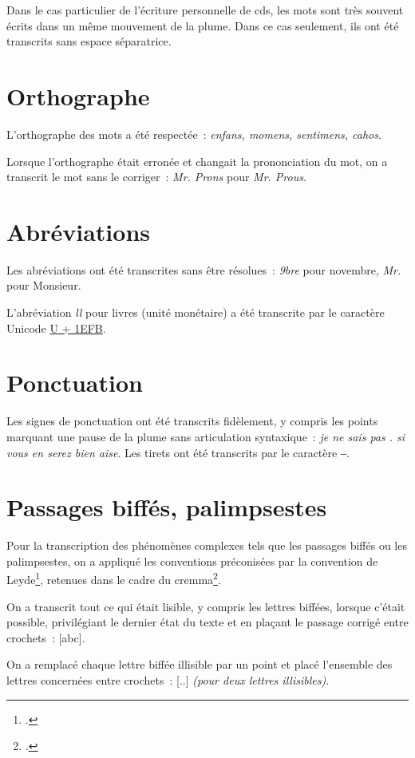 \documentclass[a4paper,12pt,twoside]{book}
\begin{document}
			Dans le cas particulier de l'écriture personnelle de \gls{cds}, les mots sont très souvent écrits dans un même mouvement de la plume. Dans ce cas seulement, ils ont été transcrits sans espace séparatrice.
				
		\section{Orthographe}
			L'orthographe des mots a été respectée~: \textit{enfans, momens, sentimens, cahos}.
			
			Lorsque l'orthographe était erronée et changait la prononciation du mot, on a transcrit le mot sans le corriger~: \textit{Mr. Prons} pour \textit{Mr. Prous}.
		
		\section{Abréviations}
			Les abréviations ont été transcrites sans être résolues~: \textit{9bre} pour novembre, \textit{Mr.} pour Monsieur.
		
			L'abréviation \textit{ll} pour livres (unité monétaire) a été transcrite par le caractère Unicode \href{https://mufi.info/m.php?p=muficharinfo&i=4088}{U + 1EFB}.

		\section{Ponctuation}
			Les signes de ponctuation ont été transcrits fidèlement, y compris les points marquant une pause de la plume sans articulation syntaxique~: \textit{je ne sais pas . si vous en serez bien aise}. Les tirets ont été transcrits par le caractère ‒.
		
		\section{Passages biffés, palimpsestes}
			Pour la transcription des phénomènes complexes tels que les passages biffés ou les palimpsestes, on a appliqué les conventions préconisées par la convention de Leyde\footcite{leidenConvention}, retenues dans le cadre du \gls{cremma}\footcite{pincheSeminaireCreationModele2021a}.
			
			On a transcrit tout ce qui était lisible, y compris les lettres biffées, lorsque c'était possible, privilégiant le dernier état du texte et en plaçant le passage corrigé entre crochets~: [abc].
		
			On a remplacé chaque lettre biffée illisible par un point et placé l'ensemble des lettres concernées entre crochets~: [..] \textit{(pour deux lettres illisibles)}.
		
\end{document}
